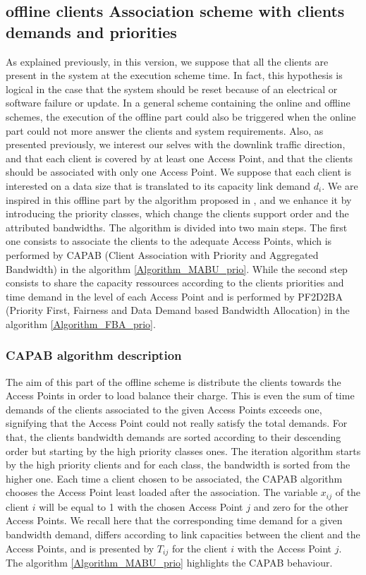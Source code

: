 \documentclass[journal,transmag]{IEEEtran}
\begin{document}
\subsection{offline clients Association scheme with clients demands and priorities}
As explained previously, in this version, we suppose that all the clients are present in the system at the execution scheme time. In fact, this hypothesis is logical in the case that the system should be reset because of an electrical or software failure or update. In a general scheme containing the online and offline schemes, the execution of the offline part could also be triggered when the online part could not more answer the clients and system requirements. Also, as presented previously, we interest our selves with the downlink traffic direction, and that each client is covered by at least one Access Point, and that the clients should be associated with only one Access Point.      
We suppose that each client is interested on a data size that is translated to its capacity link demand $d_i$. We  are inspired in this offline part by the algorithm proposed in \cite{16throughput_optimisation_association_bandwidth}, and we enhance it by introducing the priority classes, which change the clients support order and the attributed bandwidths. The algorithm is divided into two main steps. The first one consists to associate the clients to the adequate Access Points, which is performed by CAPAB (Client Association with Priority and Aggregated Bandwidth) in the algorithm \ref{Algorithm_MABU_prio}. While the second step consists to share the capacity ressources according to the clients priorities and time demand in the level of each Access Point and is performed by PF2D2BA (Priority First, Fairness and Data Demand based Bandwidth Allocation) in the algorithm \ref{Algorithm_FBA_prio}.      

\subsubsection{CAPAB algorithm description}
The aim of this part of the offline scheme is distribute the clients towards the Access Points in order to load balance their charge. This is even the sum of time demands of the clients associated to the given Access Points exceeds one, signifying that the Access Point could not really satisfy the total demands. For that, the clients bandwidth demands are sorted according to their descending order but starting by the high priority classes ones. The iteration algorithm starts by the high priority clients and for each class, the bandwidth is sorted from the higher one. Each time a client chosen to be associated, the CAPAB algorithm chooses the Access Point least loaded after the association. The variable $x_{ij}$ of the client $i$ will be equal to 1 with the chosen Access Point $j$ and zero for the other Access Points. We recall here that the corresponding time demand for a given bandwidth demand, differs according to link capacities between the client and the Access Points, and is presented by $T_{ij}$ for the client $i$ with the Access Point $j$. The algorithm \ref{Algorithm_MABU_prio} highlights the CAPAB behaviour.

    
\end{document}
